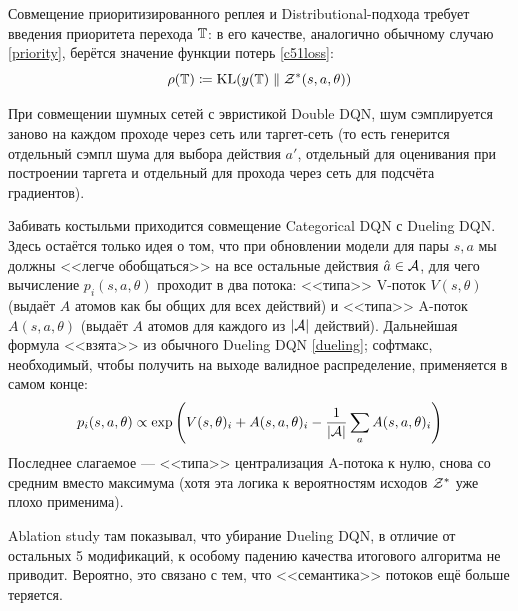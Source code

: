 Совмещение приоритизированного реплея и Distributional-подхода требует введения приоритета перехода $\mathbb{T}$: в его качестве, аналогично обычному случаю \eqref{priority}, берётся значение функции потерь \eqref{c51loss}: 
$$\rho(\mathbb{T}) \coloneqq \operatorname{KL}(y(\mathbb{T}) \parallel \mathcal{Z}^*(s, a, \theta))$$

При совмещении шумных сетей с эвристикой Double DQN, шум сэмплируется заново на каждом проходе через сеть или таргет-сеть (то есть генерится отдельный сэмпл шума для выбора действия $a'$, отдельный для оценивания при построении таргета и отдельный для прохода через сеть для подсчёта градиентов).

Забивать костыльми приходится совмещение Categorical DQN с Dueling DQN. Здесь остаётся только идея о том, что при обновлении модели для пары $s, a$ мы должны <<легче обобщаться>> на все остальные действия $\hat{a} \in \mathcal{A}$, для чего вычисление $p_i(s, a, \theta)$ проходит в два потока: <<типа>> V-поток $V(s, \theta)$ (выдаёт $A$ атомов как бы общих для всех действий) и <<типа>> A-поток $A(s, a, \theta)$ (выдаёт $A$ атомов для каждого из $|\mathcal{A}|$ действий). Дальнейшая формула <<взята>> из обычного Dueling DQN \eqref{dueling}; софтмакс, необходимый, чтобы получить на выходе валидное распределение, применяется в самом конце:
\begin{equation}\label{rainbowdueling}
p_i(s, a, \theta) \propto \operatorname{exp} \left( V(s, \theta)_i + A(s, a, \theta)_i - \frac{1}{|\mathcal{A}|}\sum_a A(s, a, \theta)_i \right)
\end{equation}
Последнее слагаемое --- <<типа>> централизация A-потока к нулю, снова со средним вместо максимума (хотя эта логика к вероятностям исходов $\mathcal{Z}^*$ уже плохо применима).

\begin{remark}
Ablation study там показывал, что убирание Dueling DQN, в отличие от остальных 5 модификаций, к особому падению качества итогового алгоритма не приводит. Вероятно, это связано с тем, что <<семантика>> потоков ещё больше теряется.
\end{remark}


